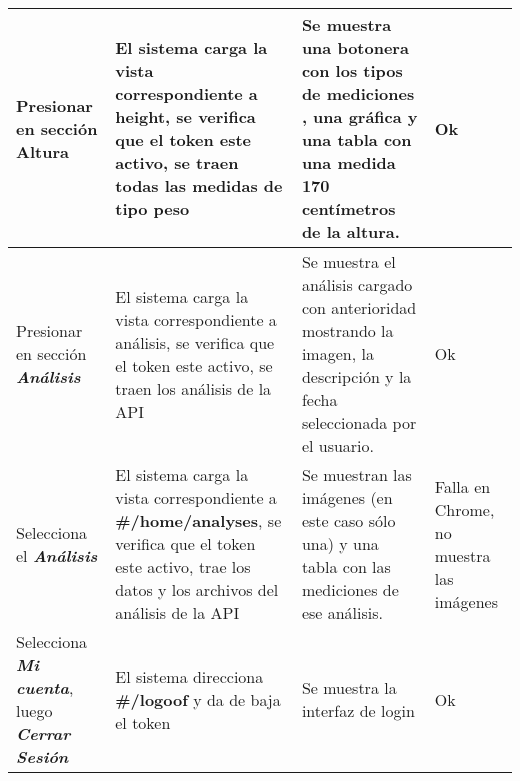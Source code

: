 {\begin{longtable}{|m{3.5cm}|m{3.5cm}|m{3.5cm}|m{2.5cm}|}
  						
  						
  						
  						Presionar en sección \textbf{Altura }
  						& El sistema carga la vista correspondiente a height, se verifica que el token este activo, se traen todas las medidas de tipo peso
  						& Se muestra una botonera con los tipos de mediciones , una gráfica y una tabla con una medida \textbf{170 centímetros} de la altura.
  						& Ok
  						\\ \hline
  						
  						
  						
  						
  						
  						Presionar en sección \textit{\textbf{Análisis }} 
  						& El sistema carga la vista correspondiente a análisis, se verifica que el token este activo, se traen los análisis de la API
  						& Se muestra el análisis cargado con anterioridad mostrando la imagen, la descripción y la fecha seleccionada por el usuario.
  						& Ok
  						\\ \hline
  						
  						
  						
  						
  						
  						
  						Selecciona el \textit{\textbf{Análisis}}
  						& El sistema carga la vista correspondiente a \textbf{ \#/home/analyses}, se verifica que el token este activo, trae los datos y los archivos del análisis de la API
  						& Se muestran las imágenes (en este caso sólo una) y una tabla con las mediciones de ese análisis.
  						& Falla en Chrome, no muestra las imágenes
  						\\ \hline
  						
  						
  						
  						
  						Selecciona \textit{\textbf{Mi cuenta}}, luego \textit{\textbf{Cerrar Sesión}}
  						& El sistema direcciona \textbf{\#/logoof } y da de baja el token
  						& Se muestra la interfaz de login
  						& Ok
  						\\ \hline
  						
  						
  					\end{longtable}
  					
  				}
  					
 
